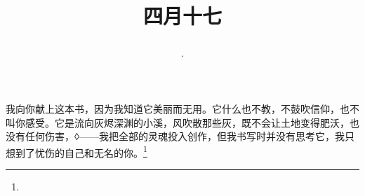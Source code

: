 \title{\date[d=24,m=5,y=2024][year:cn-y,年,month:cn,day:cn,日,·,weekday]·四月十七 }
我向你献上这本书，因为我知道它美丽而无用。它什么也不教，不鼓吹信仰，也不叫你感受。它是流向灰烬深渊的小溪，风吹散那些灰，既不会让土地变得肥沃，也没有任何伤害，◊——我把全部的灵魂投入创作，但我书写时并没有思考它，我只想到了忧伤的自己和无名的你。\footnote{ }

